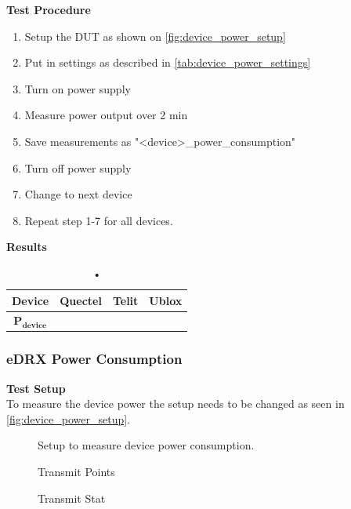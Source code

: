 \textbf{Test Procedure}\\
\begin{enumerate}
\item Setup the \gls{DUT} as shown on \autoref{fig:device_power_setup}
\item Put in settings as described in \autoref{tab:device_power_settings} 
\item Turn on power supply 
\item Measure power output over 2 min
\item Save measurements as "<device>\_power\_consumption"
\item Turn off power supply
\item Change to next device
\item Repeat step 1-7 for all devices.
\end{enumerate}

\textbf{Results}\\
\begin{table}[H]
\centering
\begin{tabular}{|c|c|c|c|}\hline
\textbf{Device}	& Quectel	& Telit & Ublox \\ \hline
$\mathbf{P_{device}}$	& & & \\ \hline
\end{tabular}
\caption{•}
\label{tab:device_power_results}
\end{table}

\subsubsection{\gls{eDRX} Power Consumption}
\textbf{Test Setup}\\
To measure the device power the setup needs to be changed as seen in \autoref{fig:device_power_setup}.

\begin{figure}[H]
\centering
{}
\caption{Setup to measure device power consumption.}
\label{fig:device_power_setup}
\end{figure}



\begin{figure}[H]
\centering
\resizebox{\textwidth}{!}{
}
\caption{Transmit Points}
\label{fig:device_power_setup}
\end{figure}

\begin{figure}[H]
\centering
\resizebox{\textwidth}{!}{
}
\caption{Transmit Stat}
\label{fig:device_power_setup}
\end{figure}

